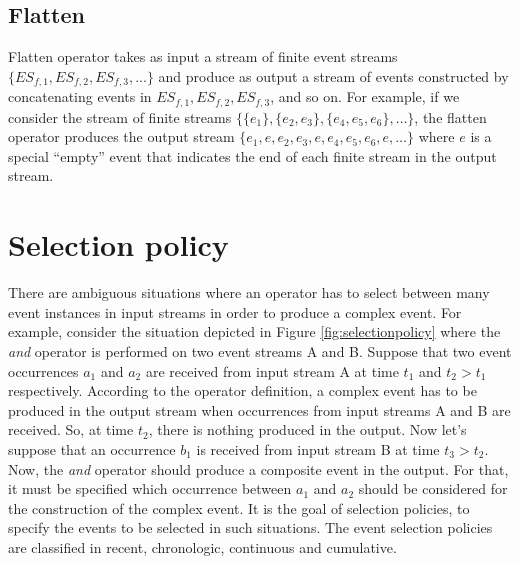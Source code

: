 \subsection{Flatten}
 Flatten operator takes as input a stream of finite event streams $\{ES_{f,1}, ES_{f,2}, ES_{f,3}, ...\}$  and produce as output a stream of events constructed by concatenating events in $ES_{f,1}, ES_{f,2}, ES_{f,3}$, and so on. 
For example, if we consider the stream of finite streams $\{\{e_1\}, \{e_2, e_3\}, \{e_4, e_5, e_6\}, …\}$, the flatten operator produces the output stream $\{e_1, e, e_2, e_3,e, e_4, e_5, e_6, e, …\}$ where $e$ is a special “empty” event that indicates the end of each finite stream in the output stream.

\section{Selection policy}
\label{ch3:sec4}
There are ambiguous situations where an operator has to select between many event instances in input streams in order to produce a complex event. For example, consider the situation depicted in Figure \ref{fig:selectionpolicy} where the \textit{and} operator is performed on two event streams A and B. Suppose that two event occurrences $a_1$ and $a_2$ are received from input stream A at time $t_1$ and $t_2 > t_1$ respectively. According to the operator definition, a complex event has to be produced in the output stream when occurrences from input streams A and B are received. So, at time $t_2$, there is nothing produced in the output. Now let's suppose that an occurrence $b_1$ is received from input stream B at time $t_3 > t_2$. Now, the \textit{and} operator should produce a composite event in the output. For that, it must be specified which occurrence between $a_1$ and $a_2$ should be considered for the construction of the complex event. It is the goal of selection policies, to specify the events to be selected in such situations. The event selection policies are classified in recent, chronologic,  continuous and cumulative.

